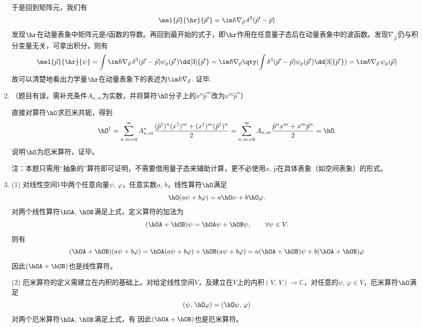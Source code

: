 \begin{enumerate}[label=2.\arabic*]
于是回到矩阵元，我们有
\[\mel{\vec{p}}{\hr}{\vec{p}'} = \im\hbar\nabla_{\vec{p}}\,\delta^3(\vec{p}'-\vec{p})\]
{\color{red}发现$\hr$在动量表象中矩阵元是$\delta$函数的导数}。再回到最开始的式子，即$\hr$作用在任意量子态后在动量表象中的波函数。发现$\nabla_{\vec{p}}$仍与积分变量无关，可拿出积分，则有
\[\mel{\vec{p}}{\hr}{\psi} = \int \im\hbar\nabla_{\vec{p}}\,\delta^3(\vec{p}'-\vec{p}) \psi_p(\vec{p}')\dd[3]{\vec{p}'} = \im\hbar\nabla_{\vec{p}} \qty( \int \delta^3(\vec{p}'-\vec{p}) \psi_p(\vec{p}')\dd[3]{\vec{p}'}) = \im\hbar\nabla_{\vec{p}}\, \psi_p(\vec{p})\]
故可以清楚地看出力学量$\hr$在动量表象下的表述为$\im\hbar\nabla_{\vec{p}}$. 证毕.

\item
（题目有误，需补充条件$A_{n,m}$为实数，并将算符$\hO$分子上的$x^n\hat{p}^m$改为$x^m\hat{p}^n$）

直接对算符$\hO$求厄米共轭，得到
\[\hO^\dagger = \sum_{n,m=0}^\infty A^*_{n,m}\frac{(\hat{p}^{\dagger})^n (x^{\dagger})^m +(x^{\dagger})^m (\hat{p}^{\dagger})^n}{2} 
= \sum_{n,m=0}^\infty A_{n,m}\frac{\hat{p}^{n}x^{m} +x^{m}\hat{p}^{n}}{2} = \hO.\]
说明$\hO$为厄米算符，证毕。

{\color{red}注：本题只需用“抽象的”算符即可证明，不需要借用量子态来辅助计算，更不必使用$x$, $\hat{p}$在具体表象（如空间表象）的形式。}

\item
(1) 对线性空间$V$中两个任意向量$\psi$, $\varphi$，任意实数$a$, $b$，线性算符$\hO$满足
\[\hO(a\psi+b\varphi) = a\hO\psi + b\hO\varphi.\]
对两个线性算符$\hOA$, $\hOB$满足上式，定义算符的加法为
\[(\hOA+\hOB)\psi = \hOA\psi + \hOB\psi,\qquad \forall \psi \in V.\]
则有
\[(\hOA+\hOB)(a\psi+b\varphi) = \hOA(a\psi+b\varphi) + \hOB(a\psi+b\varphi) = a(\hOA+\hOB)\psi + b(\hOA+\hOB)\varphi\]
因此$(\hOA+\hOB)$也是线性算符。

(2) 厄米算符的定义需建立在内积的基础上。对给定线性空间$V$，及建立在$V$上的内积$(V,\,V)\rightarrow \mathbb{C}$，对任意的$\psi$, $\varphi\in V$，厄米算符$\hO$满足
\[(\psi,\,\hO\varphi) = (\hO\psi,\,\varphi)\]
对两个厄米算符$\hOA$, $\hOB$满足上式，有
因此$(\hOA+\hOB)$也是厄米算符。


\end{enumerate}
